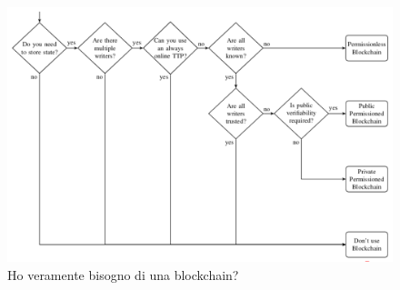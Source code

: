 \begin{figure}[H]
    \centering
    \includegraphics[scale = 0.3]{Immagini/blockchain-it-1024x676.png}
    \caption{Ho veramente bisogno di una blockchain?}
    \label{fig:do_i_need}
\end{figure}

